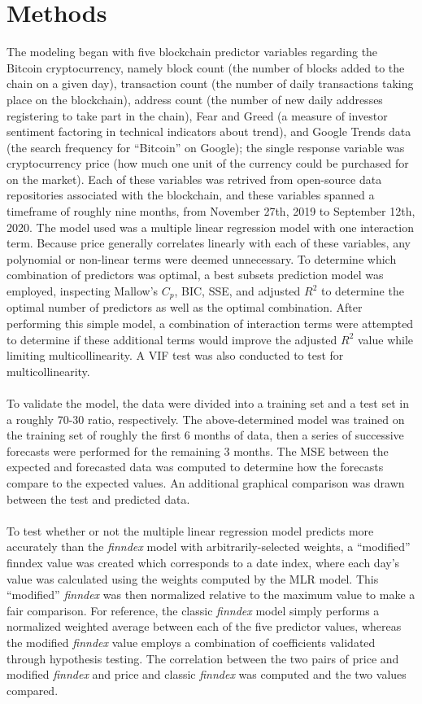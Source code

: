 \documentclass{article}
\begin{document}
\section{Methods}
The modeling began with five blockchain predictor variables regarding the Bitcoin cryptocurrency, namely block count (the number of blocks added to the chain on a given day), transaction count (the number of daily transactions taking place on the blockchain), address count (the number of new daily addresses registering to take part in the chain), Fear and Greed (a measure of investor sentiment factoring in technical indicators about trend), and Google Trends data (the search frequency for ``Bitcoin'' on Google); the single response variable was cryptocurrency price (how much one unit of the currency could be purchased for on the market). Each of these variables was retrived from open-source data repositories associated with the blockchain, and these variables spanned a timeframe of roughly nine months, from November 27th, 2019 to September 12th, 2020. The model used was a multiple linear regression model with one interaction term. Because price generally correlates linearly with each of these variables, any polynomial or non-linear terms were deemed unnecessary.  To determine which combination of predictors was optimal, a best subsets prediction model was employed, inspecting Mallow's $C_p$, BIC, SSE, and adjusted $R^2$ to determine the optimal number of predictors as well as the optimal combination. After performing this simple model, a combination of interaction terms were attempted to determine if these additional terms would improve the adjusted $R^2$ value while limiting multicollinearity. A VIF test was also conducted to test for multicollinearity.  \\~\\
To validate the model, the data were divided into a training set and a test set in a roughly 70-30 ratio, respectively. The above-determined model was trained on the training set of roughly the first 6 months of data, then a series of successive forecasts were performed for the remaining 3 months. The MSE between the expected and forecasted data was computed to determine how the forecasts compare to the expected values. An additional graphical comparison was drawn between the test and predicted data. \\~\\
To test whether or not the multiple linear regression model predicts more accurately than the \textit{finndex} model with arbitrarily-selected weights, a  ``modified'' finndex value was created which corresponds to a date index, where each day's value was calculated using the weights computed by the MLR model. This ``modified'' \textit{finndex} was then normalized relative to the maximum value to make a fair comparison. For reference, the classic \textit{finndex} model simply performs a normalized weighted average between each of the five predictor values, whereas the modified \textit{finndex} value employs a combination of coefficients validated through hypothesis testing. The correlation between the two pairs of price and modified \textit{finndex} and price and classic \textit{finndex} was computed and the two values compared.
\end{document}
